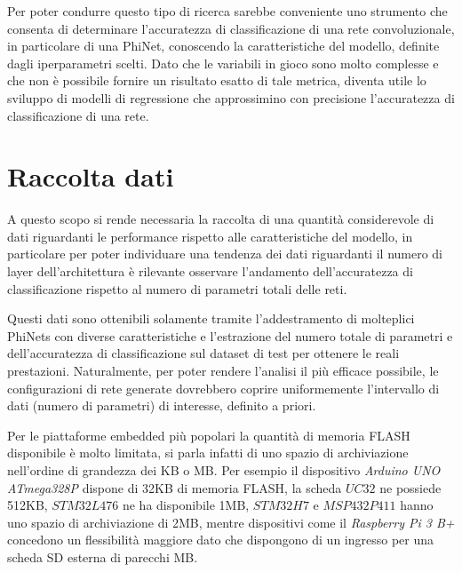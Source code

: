 Per poter condurre questo tipo di ricerca sarebbe conveniente uno strumento che consenta di determinare l'accuratezza di classificazione di una rete convoluzionale, in particolare di una PhiNet, conoscendo la caratteristiche del modello, definite dagli iperparametri scelti. Dato che le variabili in gioco sono molto complesse e che non è possibile fornire un risultato esatto di tale metrica, diventa utile lo sviluppo di modelli di regressione che approssimino con precisione l'accuratezza di classificazione di una rete.

\iffalse
SCALETTA
\begin{itemize}
    \item problema
    \item obiettivo
    \item concentro su numero di layer 
    \item perche
\end{itemize}
\fi


\section{Raccolta dati}
\label{sec:dati}

A questo scopo si rende necessaria la raccolta di una quantità considerevole di dati riguardanti le performance rispetto alle caratteristiche del modello, in particolare per poter individuare una tendenza dei dati riguardanti il numero di layer dell'architettura è rilevante osservare l'andamento dell'accuratezza di classificazione rispetto al numero di parametri totali delle reti.

Questi dati sono ottenibili solamente tramite l'addestramento di molteplici PhiNets con diverse caratteristiche e l'estrazione del numero totale di parametri e dell'accuratezza di classificazione sul dataset di test per ottenere le reali prestazioni. Naturalmente, per poter rendere l'analisi il più efficace possibile, le configurazioni di rete generate dovrebbero coprire uniformemente l'intervallo di dati (numero di parametri) di interesse, definito a priori.

Per le piattaforme embedded più popolari la quantità di memoria FLASH disponibile è molto limitata, si parla infatti di uno spazio di archiviazione nell'ordine di grandezza dei KB o MB. Per esempio il dispositivo \textit{Arduino UNO ATmega328P} dispone di 32KB di memoria FLASH, la scheda $UC32$ ne possiede 512KB, $STM32L476$ ne ha disponibile 1MB, $STM32H7$ e $MSP432P411$ hanno uno spazio di archiviazione di 2MB, mentre dispositivi come il \textit{Raspberry Pi 3 B+} concedono un flessibilità maggiore dato che dispongono di un ingresso per una scheda SD esterna di parecchi MB.

